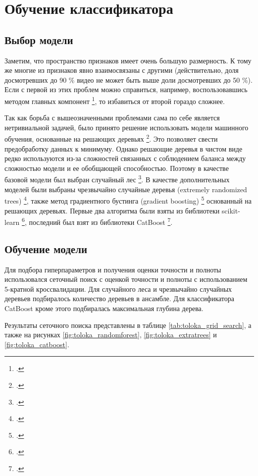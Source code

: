 \chapter{Обучение классификатора}

\section{Выбор модели}

Заметим, что пространство признаков имеет очень большую размерность. К тому же многие из признаков явно взаимосвязаны с другими (действительно, доля досмотревших до 90 \% видео не может быть выше доли досмотревших до 50 \%). Если с первой из этих проблем можно справиться, например, воспользовавшись методом главных компонент \footcite{Pearson1901}, то избавиться от второй гораздо сложнее.

Так как борьба с вышеозначенными проблемами сама по себе является нетривиальной задачей, было принято решение использовать модели машинного обучения, основанные на решающих деревьях \footcite{LeoConsultant1984}. Это позволяет свести предобработку данных к минимуму. Однако решающие деревья в чистом виде редко используются из-за сложностей связанных с соблюдением баланса между сложностью модели и ее обобщающей способностью. Поэтому в качестве базовой модели был выбран случайный лес \footcite{Ho}. В качестве дополнительных моделей были выбраны чрезвычайно случайные деревья (extremely randomized trees) \footcite{Geurts2006}, также метод градиентного бустинга (gradient boosting) \footcite{Friedman2001} основанный на решающих деревьях. Первые два алгоритма были взяты из библиотеки scikit-learn \footcite{scikit-learn}, последний был взят из библиотеки CatBoost \footcite{Prokhorenkova2017}.

\section{Обучение модели}

Для подбора гиперпараметров и получения оценки точности и полноты использовался сеточный поиск с оценкой точности и полноты с использованием 5-кратной кроссвалидации. Для случайного леса и чрезвычайно случайных деревьев подбиралось количество деревьев в ансамбле. Для классификатора CatBoost кроме этого подбиралась максимальная глубина дерева.

Результаты сеточного поиска представлены в таблице \ref{tab:toloka_grid_search}, а также на рисунках \ref{fig:toloka_randomforest}, \ref{fig:toloka_extratrees} и \ref{fig:toloka_catboost}.

